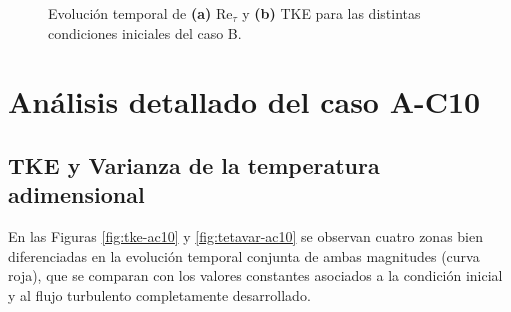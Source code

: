 \begin{figure}[H]
  \centering  

  \caption{Evolución temporal de \textbf{(a)} Re$_{\tau}$ y \textbf{(b)} TKE para las distintas condiciones iniciales del caso B.}
  \label{fig:case-B-Re5000-Pr071}
\end{figure}


\section{Análisis detallado del caso A-C10} \label{sec:ac10}

\subsection{TKE y Varianza de la temperatura adimensional}
En las Figuras \ref{fig:tke-ac10} y \ref{fig:tetavar-ac10} se observan cuatro zonas bien diferenciadas en la evolución temporal conjunta de ambas magnitudes (curva roja), que se comparan con los valores constantes asociados a la condición inicial y al flujo turbulento completamente desarrollado.

